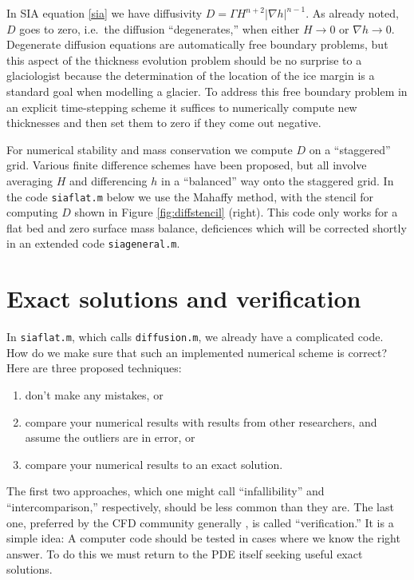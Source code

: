 \documentclass[letterpaper,final,12pt,reqno]{amsart}
\newcommand{\grad}{\nabla}
\newcommand{\minput}[1]{
\vspace{0.8cm}
\VerbatimInput[frame=single,framesep=3mm,label=\fbox{\normalsize \textsl{\,#1.m\,}},fontfamily=courier,fontsize=\footnotesize]{tmp/#1.slim.m}
\vspace{0.5cm}
}
\begin{document}
In SIA equation \eqref{sia} we have diffusivity $D = \Gamma H^{n+2} |\grad h|^{n-1}$.  As already noted, $D$ goes to zero, i.e.~the diffusion ``degenerates,'' when either $H\to 0$ or $\grad h \to 0$.  Degenerate diffusion equations are automatically free boundary problems, but this aspect of the thickness evolution problem should be no surprise to a glaciologist because the determination of the location of the ice margin is a standard goal when modelling a glacier.  To address this free boundary problem in an explicit time-stepping scheme it suffices to numerically compute new thicknesses and then set them to zero if they come out negative.

For numerical stability and mass conservation we compute $D$ on a ``staggered'' grid.  Various finite difference schemes have been proposed, but all involve averaging $H$ and differencing $h$ in a ``balanced'' way onto the staggered grid.  In the code \texttt{siaflat.m} below we use the Mahaffy \cite{Mahaffy} method, with the stencil for computing $D$ shown in Figure \ref{fig:diffstencil} (right).  This code only works for a flat bed and zero surface mass balance, deficiences which will be corrected shortly in an extended code \texttt{siageneral.m}.

\minput{siaflat}


\section{Exact solutions and verification} \label{sec:exactsolutions}

In \texttt{siaflat.m}, which calls \texttt{diffusion.m}, we already have a complicated code.  How do we make sure that such an implemented numerical scheme is correct?  Here are three proposed techniques:
\begin{enumerate}
  \item don't make any mistakes, or
  \item compare your numerical results with results from other researchers, and assume the outliers are in error, or
  \item compare your numerical results to an exact solution.   \end{enumerate}
The first two approaches, which one might call ``infallibility'' and ``intercomparison,'' respectively, should be less common than they are.  The last one, preferred by the CFD community generally \cite{Roache,Wesseling}, is called ``verification.''  It is a simple idea:  A computer code should be tested in cases where we know the right answer.  To do this we must return to the PDE itself seeking useful exact solutions.
\end{document}
